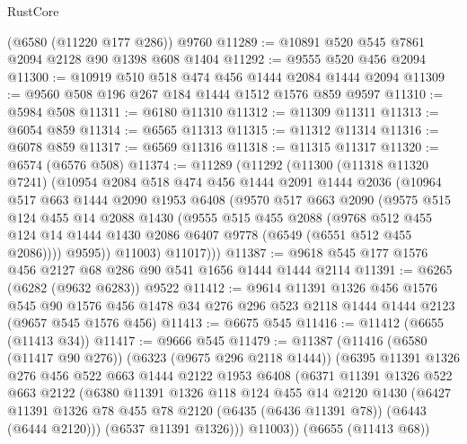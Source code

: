 \begin{lexlean}{RustCore}
\begin{coremodule}
    (@6580 (@11220 @177 @286))
    @9760
@11289 := @10891 @520 @545 @7861 @2094 @2128 @90 @1398 @608 @1404
@11292 := @9555 @520 @456 @2094
@11300 := @10919 @510 @518 @474 @456 @1444 @2084 @1444 @2094
@11309 := @9560 @508 @196 @267 @184 @1444 @1512 @1576 @859 @9597
@11310 := @5984 @508
@11311 := @6180 @11310
@11312 := @11309 @11311
@11313 := @6054 @859
@11314 := @6565 @11313
@11315 := @11312 @11314
@11316 := @6078 @859
@11317 := @6569 @11316
@11318 := @11315 @11317
@11320 := @6574 (@6576 @508)
@11374 := @11289
    (@11292
      (@11300
        (@11318 @11320 @7241)
        (@10954
          @2084
          @518
          @474
          @456
          @1444
          @2091
          @1444
          @2036
          (@10964
            @517
            @663
            @1444
            @2090
            @1953
            @6408
            (@9570
              @517
              @663
              @2090
              (@9575
                @515
                @124
                @455
                @14
                @2088
                @1430
                (@9555
                  @515
                  @455
                  @2088
                  (@9768
                    @512
                    @455
                    @124
                    @14
                    @1444
                    @1430
                    @2086
                    @6407
                    @9778
                    (@6549 (@6551 @512 @455 @2086))))
                @9595))
            @11003)
          @11017)))
@11387 := @9618 @545 @177 @1576 @456 @2127 @68 @286 @90 @541 @1656 @1444 @1444 @2114
@11391 := @6265 (@6282 (@9632 @6283)) @9522
@11412 := @9614
    @11391
    @1326
    @456
    @1576
    @545
    @90
    @1576
    @456
    @1478
    @34
    @276
    @296
    @523
    @2118
    @1444
    @1444
    @2123
    (@9657 @545 @1576 @456)
@11413 := @6675 @545
@11416 := @11412 (@6655 (@11413 @34))
@11417 := @9666 @545
@11479 := @11387
    (@11416
      (@6580 (@11417 @90 @276))
      (@6323 (@9675 @296 @2118 @1444))
      (@6395
        @11391
        @1326
        @276
        @456
        @522
        @663
        @1444
        @2122
        @1953
        @6408
        (@6371
          @11391
          @1326
          @522
          @663
          @2122
          (@6380
            @11391
            @1326
            @118
            @124
            @455
            @14
            @2120
            @1430
            (@6427 @11391 @1326 @78 @455 @78 @2120 (@6435 (@6436 @11391 @78)) (@6443 (@6444 @2120)))
            (@6537 @11391 @1326)))
        @11003))
    (@6655 (@11413 @68))

\end{coremodule}
\end{lexlean}
